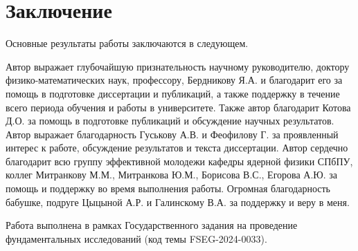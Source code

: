 \chapter*{Заключение}                       %


Основные результаты работы заключаются в следующем.


Автор выражает глубочайшую признательность научному руководителю, доктору физико-математических наук, профессору, Бердникову Я.А. и благодарит его за помощь в подготовке диссертации и публикаций, а также поддержку в течение всего периода обучения и работы в университете. Также автор благодарит Котова Д.О. за помощь в подготовке публикаций и обсуждение научных результатов. Автор выражает благодарность Гуськову А.В. и Феофилову Г. за проявленный интерес к работе, обсуждение результатов и текста диссертации. Автор сердечно благодарит всю группу эффективной молодежи кафедры ядерной физики СПбПУ, коллег Митранкову М.М., Митранкова Ю.М., Борисова В.С., Егорова А.Ю. за помощь и поддержку во время выполнения работы.
Огромная благодарность бабушке, подруге Цыцыной А.Р. и Галинскому В.А. за поддержку и веру в меня.

Работа выполнена в рамках Государственного задания на проведение фундаментальных исследований (код темы FSEG-2024-0033). 
